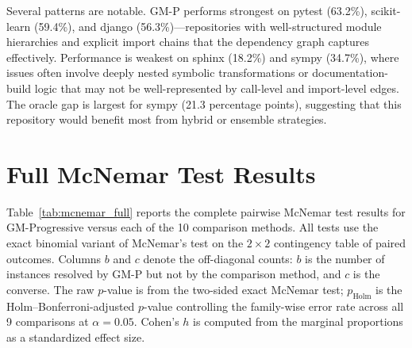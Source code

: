 \noindent
Several patterns are notable.
GM-P performs strongest on pytest (63.2\%), scikit-learn (59.4\%), and django (56.3\%)---repositories with well-structured module hierarchies and explicit import chains that the dependency graph captures effectively.
Performance is weakest on sphinx (18.2\%) and sympy (34.7\%), where issues often involve deeply nested symbolic transformations or documentation-build logic that may not be well-represented by call-level and import-level edges.
The oracle gap is largest for sympy (21.3 percentage points), suggesting that this repository would benefit most from hybrid or ensemble strategies.


\section{Full McNemar Test Results}
\label{app:mcnemar}

Table~\ref{tab:mcnemar_full} reports the complete pairwise McNemar test results for GM-Progressive versus each of the 10 comparison methods.
All tests use the exact binomial variant of McNemar's test on the $2 \times 2$ contingency table of paired outcomes.
Columns $b$ and $c$ denote the off-diagonal counts: $b$ is the number of instances resolved by GM-P but not by the comparison method, and $c$ is the converse.
The raw $p$-value is from the two-sided exact McNemar test; $p_{\text{Holm}}$ is the Holm--Bonferroni-adjusted $p$-value controlling the family-wise error rate across all 9 comparisons at $\alpha = 0.05$.
Cohen's $h$ is computed from the marginal proportions as a standardized effect size.

